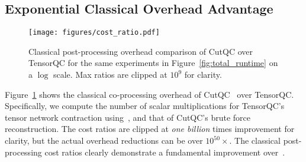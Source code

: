 \subsection{Exponential Classical Overhead Advantage}
\begin{figure}[t]
    \centering
    \texttt{[image: figures/cost\_ratio.pdf]}
    \caption{Classical post-processing overhead comparison of CutQC over TensorQC
    for the same experiments in Figure~\ref{fig:total_runtime} on a $\log$ scale.
    Max ratios are clipped at $10^9$ for clarity.}
    \label{fig:cost_ratio}
\end{figure}

Figure~\ref{fig:cost_ratio} shows the classical co-processing overhead of CutQC~\cite{tang2021cutqc} over TensorQC.
Specifically, we compute the number of scalar multiplications for TensorQC's tensor network contraction using~\cite{gray2021hyper},
and that of CutQC's brute force reconstruction.
The cost ratios are clipped at \textit{one billion} times improvement for clarity,
but the actual overhead reductions can be over $10^{50}\times$.
The classical post-processing cost ratios clearly demonstrate a fundamental improvement over~\cite{tang2021cutqc}.

